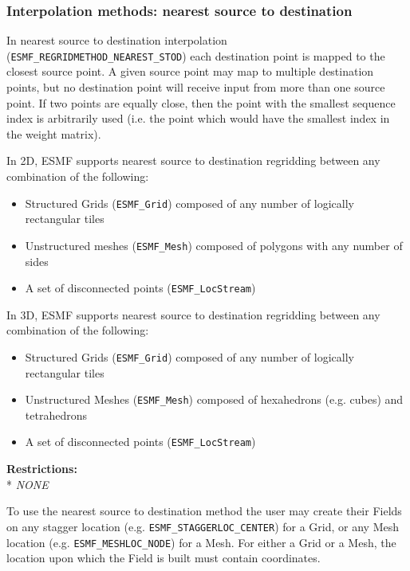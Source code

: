\subsubsection{Interpolation methods: nearest source to destination}\label{sec:interpolation:neareststod}
In nearest source to destination interpolation ({\tt ESMF\_REGRIDMETHOD\_NEAREST\_STOD}) each destination point is mapped to the closest source point. A given source point may map to multiple destination points, but no destination point will receive input from more than one source point. If two points are equally close, then the point with the smallest sequence index is arbitrarily used (i.e. the point which would have the smallest index in the weight matrix). 

\smallskip

 In 2D, ESMF supports nearest source to destination regridding between any combination of the following:
 \begin{itemize}
 \item Structured Grids ({\tt ESMF\_Grid}) composed of any number of logically rectangular tiles
 \item Unstructured meshes ({\tt ESMF\_Mesh}) composed of polygons with any number of sides
 \item A set of disconnected points ({\tt ESMF\_LocStream}) 
 \end{itemize}

\smallskip

 In 3D, ESMF supports nearest source to destination regridding between any combination of the following:
 \begin{itemize}
 \item Structured Grids ({\tt ESMF\_Grid}) composed of any number of logically rectangular tiles
 \item Unstructured Meshes ({\tt ESMF\_Mesh}) composed of hexahedrons (e.g. cubes) and tetrahedrons
 \item A set of disconnected points ({\tt ESMF\_LocStream}) 
 \end{itemize}

\smallskip

\textbf{Restrictions:}\\*
\textit{NONE}

\smallskip

 To use the nearest source to destination method the user may create their Fields on any stagger location (e.g. {\tt ESMF\_STAGGERLOC\_CENTER}) for a Grid, or
 any Mesh location (e.g. {\tt ESMF\_MESHLOC\_NODE}) for a Mesh. For either a Grid or a Mesh, the location upon which the Field is built 
 must contain coordinates. 



